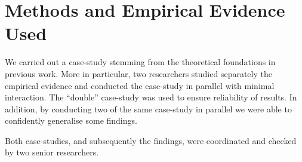 \documentclass[conference]{IEEEtran}
\begin{document}
% 
%
%
%
%

\section{Methods and Empirical Evidence Used}\label{mm}
We carried out a case-study stemming from the theoretical foundations in previous work. More in particular, two researchers studied separately the empirical evidence and conducted the case-study in parallel with minimal interaction. The ``double'' case-study was used to ensure reliability of results. In addition, by conducting two of the same case-study in parallel we were able to confidently generalise some findings.

Both case-studies, and subsequently the findings, were coordinated and checked by two senior researchers.
\end{document}
